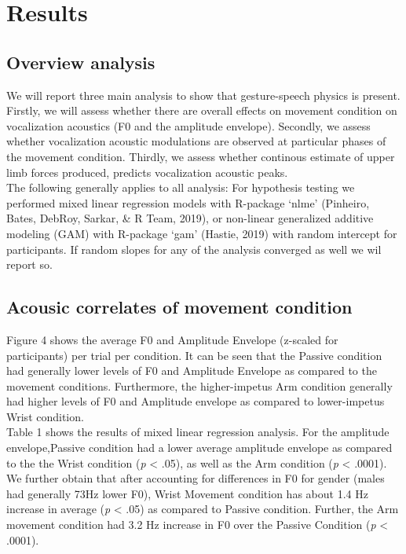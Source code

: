 \documentclass[
  man, noextraspace,floatsintext]{apa6}
\begin{document}
\hypertarget{results}{%
\section{Results}\label{results}}

\hypertarget{overview-analysis}{%
\subsection{Overview analysis}\label{overview-analysis}}

We will report three main analysis to show that gesture-speech physics is present. Firstly, we will assess whether there are overall effects on movement condition on vocalization acoustics (F0 and the amplitude envelope). Secondly, we assess whether vocalization acoustic modulations are observed at particular phases of the movement condition. Thirdly, we assess whether continous estimate of upper limb forces produced, predicts vocalization acoustic peaks.\\
The following generally applies to all analysis: For hypothesis testing we performed mixed linear regression models with R-package `nlme' (Pinheiro, Bates, DebRoy, Sarkar, \& R Team, 2019), or non-linear generalized additive modeling (GAM) with R-package `gam' (Hastie, 2019) with random intercept for participants. If random slopes for any of the analysis converged as well we wil report so.

\hypertarget{acousic-correlates-of-movement-condition}{%
\subsection{Acousic correlates of movement condition}\label{acousic-correlates-of-movement-condition}}

Figure 4 shows the average F0 and Amplitude Envelope (z-scaled for participants) per trial per condition. It can be seen that the Passive condition had generally lower levels of F0 and Amplitude Envelope as compared to the movement conditions. Furthermore, the higher-impetus Arm condition generally had higher levels of F0 and Amplitude envelope as compared to lower-impetus Wrist condition.\\
Table 1 shows the results of mixed linear regression analysis. For the amplitude envelope,Passive condition had a lower average amplitude envelope as compared to the the Wrist condition (\emph{p} \textless{} .05), as well as the Arm condition (\emph{p} \textless{} .0001). We further obtain that after accounting for differences in F0 for gender (males had generally 73Hz lower F0), Wrist Movement condition has about 1.4 Hz increase in average (\emph{p} \textless{} .05) as compared to Passive condition. Further, the Arm movement condition had 3.2 Hz increase in F0 over the Passive Condition (\emph{p} \textless{} .0001).
\end{document}
